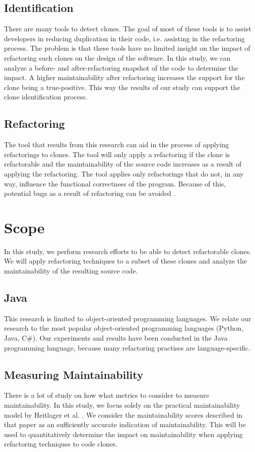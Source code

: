 \subsection{Identification}
There are many tools to detect clones. The goal of most of these tools is to assist developers in reducing duplication in their code, i.e. assisting in the refactoring process. The problem is that these tools have no limited %
insight on the impact of refactoring such clones on the design of the software. In this study, we can analyze a before- and after-refactoring snapshot of the code to determine the impact. A higher maintainability after refactoring increases the support for the clone being a true-positive. This way the results of our study can support the clone identification process.

\subsection{Refactoring}
The tool that results from this research can aid in the process of applying refactorings to clones. The tool will only apply a refactoring if the clone is refactorable and the maintainability of the source code increases as a result of applying the refactoring. The tool applies only refactorings that do not, in any way, influence the functional correctness of the program. Because of this, potential bugs as a result of refactoring can be avoided \cite{bavota2012does}.

\section{Scope}
In this study, we perform research efforts to be able to detect refactorable clones. We will apply refactoring techniques to a subset of these clones and analyze the maintainability of the resulting source code.

\subsection{Java}
This research is limited to object-oriented programming languages. We relate our research to the most popular object-oriented programming languages (Python, Java, C\#). Our experiments and results have been conducted in the Java programming language, because many refactoring practises are language-specific.

\subsection{Measuring Maintainability}
There is a lot of study on how what metrics to consider to measure maintainability. In this study, we focus solely on the practical maintainability model by Heitlager et al. \cite{heitlager2007practical}. We consider the maintainability scores described in that paper as an sufficiently accurate indication of maintainability. This will be used to quantitatively determine the impact on maintainability when applying refactoring techniques to code clones.

